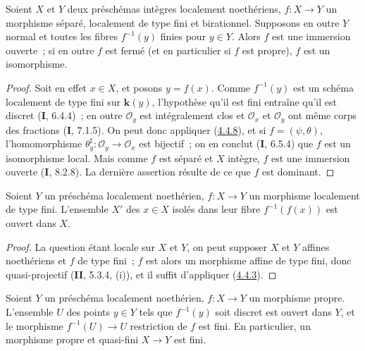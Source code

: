 \begin{corollary}[4.4.9]
\label{III.4.4.9-fr}
Soient $X$ et $Y$ deux préschémas intègres localement noethériens, $f:X\to Y$ un
morphisme séparé, localement de type fini et birationnel. Supposons en outre $Y$ normal
et toutes les fibres $f^{-1}(y)$ finies pour $y\in Y$. Alors $f$ est une
immersion ouverte~; si en outre $f$ est fermé (et en particulier si $f$ est
propre), $f$ est un isomorphisme.
\end{corollary}

\begin{proof}
Soit en effet $x\in X$, et posons $y=f(x)$. Comme $f^{-1}(y)$ est un schéma
localement de type fini sur $\boldsymbol{k}(y)$, l'hypothèse qu'il est fini entraîne qu'il est discret
(\textbf{I}, 6.4.4)~; en outre $\mathcal O_y$ est intégralement clos et
$\mathcal O_x$ et $\mathcal O_y$ ont même corps des fractions (\textbf{I}, 7.1.5).
On peut donc appliquer (\hyperref[III.4.4.8-fr]{4.4.8}), et si
$f=(\psi,\theta)$, l'homomorphisme
$\theta_y^\sharp:\mathcal O_y\to\mathcal O_x$ est bijectif~; on en conclut
(\textbf{I}, 6.5.4) que $f$ est un isomorphisme local. Mais comme $f$ est séparé et
$X$ intègre, $f$ est une immersion ouverte (\textbf{I}, 8.2.8). La dernière assertion
résulte de ce que $f$ est dominant.
\end{proof}

\begin{proposition}[4.4.10]
\label{III.4.4.10-fr}
Soient $Y$ un préschéma localement noethérien, $f:X\to Y$ un morphisme
localement de type fini. L'ensemble $X'$ des $x\in X$ isolés dans leur fibre
$f^{-1}(f(x))$ est ouvert dans $X$.
\end{proposition}

\begin{proof}
La question étant locale sur $X$ et $Y$, on peut supposer $X$ et $Y$ affines
noethériens et $f$ de type fini~; $f$ est alors un morphisme affine de type
fini, donc quasi-projectif (\textbf{II}, 5.3.4, (i)), et il suffit d'appliquer
(\hyperref[III.4.4.3-fr]{4.4.3}).
\end{proof}


\begin{corollary}[4.4.11]
\label{III.4.4.11-fr}
Soient $Y$ un préschéma localement noethérien, $f:X\to Y$ un morphisme
propre. L'ensemble $U$ des points $y\in Y$ tels que $f^{-1}(y)$ soit discret
est ouvert dans $Y$, et le morphisme $f^{-1}(U)\to U$ restriction de $f$ est
fini. En particulier, un morphisme propre et quasi-fini $X\to Y$ est fini.
\end{corollary}

